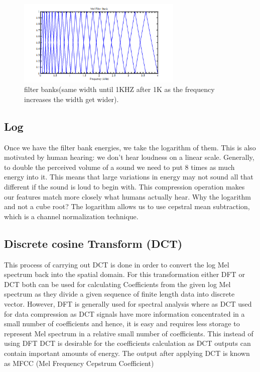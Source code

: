 \documentclass[12pt, a4paper, twoside]{report}
\begin{document}
\begin{figure}[!h]
	\centering
	\includegraphics[width=0.7\textwidth]
	{images/chapter3/mel-banks}
	\caption{filter banks(same width until 1KHZ after 1K as the frequency increases the width get wider).}
	\label{fig:mel-banks}
\end{figure}

\subsection{Log}
Once we have the filter bank energies, we take the logarithm of them. This is also motivated by human hearing: we don't hear loudness on a linear scale. Generally, to double the perceived volume of a sound we need to put 8 times as much energy into it. This means that large variations in energy may not sound all that different if the sound is loud to begin with. This compression operation makes our features match more closely what humans actually hear. Why the logarithm and not a cube root? The logarithm allows us to use cepstral mean subtraction, which is a channel normalization technique.

\subsection{Discrete cosine Transform (DCT)}
This process of carrying  out  DCT  is  done  in  order  to  convert  the  log  Mel  spectrum  back  into  the spatial  domain.  For this transformation either  DFT  or  DCT  both  can  be  used  for  calculating Coefficients from the given log Mel spectrum as they divide a given sequence of finite length data into discrete  vector.  However,  DFT  is  generally  used  for  spectral  analysis  where  as  DCT  used  for  data compression  as  DCT  signals  have  more  information  concentrated  in  a  small  number  of  coefficients and hence, it is easy and requires less storage to represent Mel spectrum in a relative small number of coefficients.  This instead of  using  DFT  DCT  is  desirable  for  the coefficients calculation  as  DCT outputs can contain important amounts of energy. The output after applying DCT is known as MFCC (Mel Frequency Cepstrum Coefficient)
\end{document}
